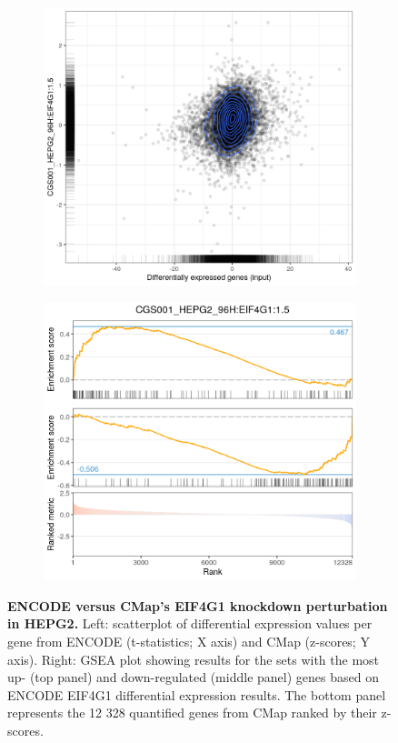 \begin{figure}[!h]
	\centering
	\begin{subfigure}[h]{0.45\textwidth}
		\includegraphics[width=\textwidth]{images/ctrap/eif4g1-compound-plot-scatter}
	\end{subfigure}
	\begin{subfigure}[h]{0.45\textwidth}
		\includegraphics[width=\textwidth]{images/ctrap/eif4g1-compound-plot-gsea}
	\end{subfigure}
    \caption[EIF4G1 knockdown perturbation in HEPG2]{\textbf{ENCODE versus CMap's EIF4G1 knockdown perturbation in HEPG2.} Left: scatterplot of differential expression values per gene from ENCODE (t-statistics; X axis) and CMap (z-scores; Y axis). Right: GSEA plot showing results for the sets with the most up- (top panel) and down-regulated (middle panel) genes based on ENCODE EIF4G1 differential expression results. The bottom panel represents the 12 328 quantified genes from CMap ranked by their z-scores.}
    \label{fig:eif4g1-compound-plots}
\end{figure}

